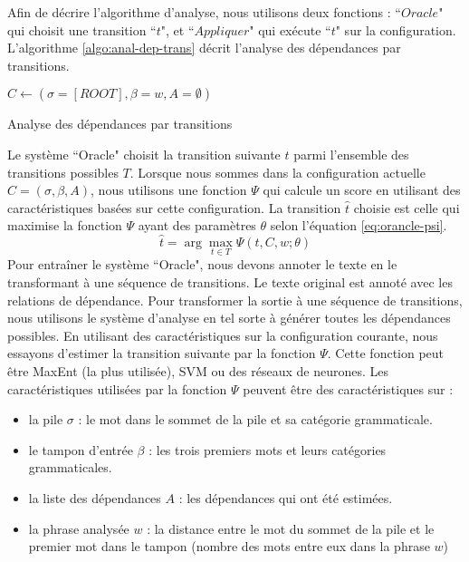 \documentclass{KodeBook}
\begin{document}
Afin de décrire l'algorithme d'analyse, nous utilisons deux fonctions : ``$Oracle$" qui choisit une transition ``$t$", et ``$Appliquer$" qui exécute ``$t$" sur la configuration. 
L'algorithme \ref{algo:anal-dep-trans} décrit l'analyse des dépendances par transitions.

\begin{algorithm}[ht]
	
	$C \leftarrow (\sigma=[ROOT], \beta = w, A = \emptyset)$\;
	
	
	
	\caption{Analyse des dépendances par transitions \label{algo:anal-dep-trans}}
\end{algorithm}

Le système ``Oracle" choisit la transition suivante $\hat{t}$ parmi l'ensemble des transitions possibles $T$.
Lorsque nous sommes dans la configuration actuelle $ C = (\sigma, \beta, A) $, nous utilisons une fonction $\Psi$ qui calcule un score en utilisant des caractéristiques basées sur cette configuration.
La transition $\hat{t}$ choisie est celle qui maximise la fonction $\Psi$ ayant des paramètres $\theta$ selon l'équation \ref{eq:orancle-psi}.
\begin{equation}\label{eq:orancle-psi}
\hat{t} = \arg\max\limits_{t \in T} \Psi (t, C, w; \theta)
\end{equation}
Pour entraîner le système ``Oracle", nous devons annoter le texte en le transformant à une séquence de transitions. 
Le texte original est annoté avec les relations de dépendance. 
Pour transformer la sortie à une séquence de transitions, nous utilisons le système d'analyse en tel sorte à générer toutes les dépendances possibles. 
En utilisant des caractéristiques sur la configuration courante, nous essayons d'estimer la transition suivante par la fonction $\Psi$.  
Cette fonction peut être MaxEnt (la plus utilisée), SVM ou des réseaux de neurones. 
Les caractéristiques utilisées par la fonction $\Psi$ peuvent être des caractéristiques sur :  
\begin{itemize}
	\item la pile $\sigma$ : le mot dans le sommet de la pile et sa catégorie grammaticale. 
	\item le tampon d'entrée $\beta$ : les trois premiers mots et leurs catégories grammaticales.
	\item la liste des dépendances $A$ : les dépendances qui ont été estimées.
	\item la phrase analysée $w$ : la distance entre le mot du sommet de la pile et le premier mot dans le tampon (nombre des mots entre eux dans la phrase $w$)
\end{itemize}
\end{document}

